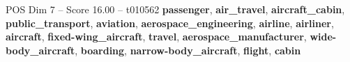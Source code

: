 \begin{textsample}{POS Dim 7 – Score 16.00 – t010562}  \label{ex:f7_pos_032}
\textbf{passenger}, \textbf{air\_travel}, \textbf{aircraft\_cabin}, \textbf{public\_transport}, \textbf{aviation}, \textbf{aerospace\_engineering}, \textbf{airline}, \textbf{airliner}, \textbf{aircraft}, \textbf{fixed-wing\_aircraft}, \textbf{travel}, \textbf{aerospace\_manufacturer}, \textbf{wide-body\_aircraft}, \textbf{boarding}, \textbf{narrow-body\_aircraft}, \textbf{flight}, \textbf{cabin}

\end{textsample}
